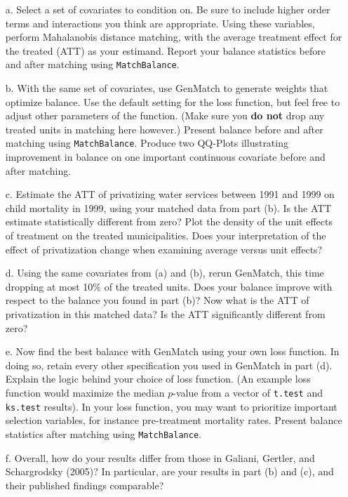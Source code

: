 \documentclass{article}
\begin{document}
\begin{itemize}
\item[a.] Select a set of covariates to condition on. Be sure to
  include higher order terms and interactions you think are
  appropriate. Using these variables, perform Mahalanobis distance
  matching, with the average treatment effect for the treated (ATT) as
  your estimand. Report your balance statistics before and after
  matching using \texttt{MatchBalance}.

\item[b.] With the same set of covariates, use GenMatch to generate
  weights that optimize balance. Use the default setting for the loss
  function, but feel free to adjust other parameters of the
  function. (Make sure you {\bf do not} drop any treated units in
  matching here however.)  Present balance before and after matching
  using \texttt{MatchBalance}.  Produce two QQ-Plots illustrating
  improvement in balance on one important continuous covariate before
  and after matching.

\item[c.] Estimate the ATT of privatizing
  water services between 1991 and 1999 on child mortality in 1999,
  using your matched data from part (b).  Is the ATT estimate
  statistically different from zero?  Plot the density of the unit effects of treatment on
  the treated municipalities.  Does your interpretation of the effect
  of privatization change when examining average versus unit effects?    

\item[d.] Using the same covariates from (a) and (b), rerun GenMatch, this
  time dropping at most 10\% of the treated units. Does your balance
  improve with respect to the balance you found in part (b)? Now what
  is the ATT of privatization in this matched data?  Is the ATT
  significantly different from zero?  


\item[e.] Now find the best balance with GenMatch using your own loss
  function.  In doing so, retain every other specification you used in
  GenMatch in part (d).  Explain the logic behind your choice of loss
  function. (An example loss function would maximize the median
  $p$-value from a vector of \texttt{t.test} and \texttt{ks.test}
  results). In your loss function, you may want to prioritize
  important selection variables, for instance pre-treatment mortality
  rates. Present balance statistics after matching using
  \texttt{MatchBalance}.

\item[f.] Overall, how do your results differ from those in Galiani,
  Gertler, and Schargrodsky (2005)?  In particular, are your results
  in part (b) and (c), and their published findings comparable? 

\end{itemize}
\end{document}
